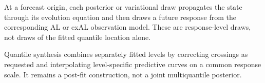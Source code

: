 At a forecast origin, each posterior or variational draw propagates the state
through its evolution equation and then draws a future response from the
corresponding AL or exAL observation model. These are response-level draws,
not draws of the fitted quantile location alone.

Quantile synthesis combines separately fitted levels by correcting crossings
as requested and interpolating level-specific predictive curves on a common
response scale. It remains a post-fit construction, not a joint multiquantile
posterior.

